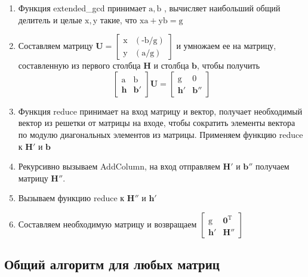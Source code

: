\begin{enumerate}
\item Функция extended\_gcd принимает $ \mathrm{a, b} $ , вычисляет наибольший общий делитель и целые $ \mathrm{x, y} $ такие, что $ \mathrm{xa + yb = g} $
\item Составляем матрицу $ \mathbf{U}= \left[\begin{array}{cccc}
\mathrm{x} & \mathrm{(\text{-}b/g)} \\
\mathrm{y} & \mathrm{(a/g)} \end{array}\right] $ и умножаем ее на матрицу, составленную из первого столбца $ \mathbf{H} $ и столбца $ \mathbf{b} $, чтобы получить
$$ \left[\begin{array}{cccc}
\mathrm{a} & \mathrm{b} \\
\mathbf{h} & \mathbf{b}' \end{array}\right] \mathbf{U}=
\left[\begin{array}{cccc}
\mathrm{g} & \mathrm{0} \\
\mathbf{h}' & \mathbf{b}'' \end{array}\right] $$
\item Функция reduce принимает на вход матрицу и вектор, получает необходимый вектор из решетки от матрицы на входе, чтобы сократить элементы вектора по модулю диагональных элементов из матрицы. Применяем функцию reduce к $ \mathbf{H}' $ и $ \mathbf{b} $
\item Рекурсивно вызываем AddColumn, на вход отправляем $ \mathbf{H}' $ и $ \mathbf{b}'' $  получаем матрицу $ \mathbf{H}'' $.
\item Вызываем функцию reduce к $ \mathbf{H}'' $ и $ \mathbf{h}' $
\item Составляем необходимую матрицу и возвращаем $ \left[\begin{array}{cccc}
\mathrm{g} & \mathbf{0}^\mathrm{T} \\
\mathbf{h}' & \mathbf{H}'' \end{array}\right] $
\end{enumerate}

\subsection{Общий алгоритм для любых матриц}

